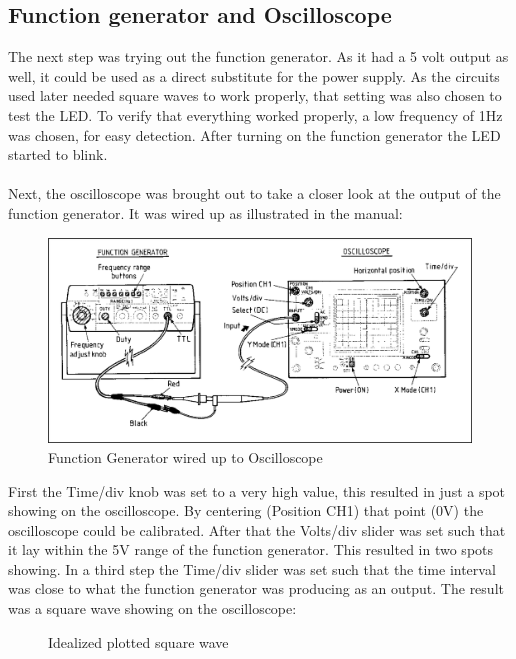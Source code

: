 \documentclass[fleqn,14pt]{article}
\begin{document}
\subsection {Function generator and Oscilloscope}
The next step was trying out the function generator. As it had a 5 volt output as well, it could be used as
a direct substitute for the power supply. As the circuits used later needed square waves to work properly,
that setting was also chosen to test the LED. To verify that everything worked properly, a low frequency of 1Hz
was chosen, for easy detection. After turning on the function generator the LED started
to blink.\\
\\
Next, the oscilloscope was brought out to take a closer look at the output of the function generator. It
was wired up as illustrated in the manual:
\begin{figure}[h]
\includegraphics[width=16cm]{images/Oscilloscope.png}
\caption{Function Generator wired up to Oscilloscope \cite{ross}}
\label{fig:figure1}
\end{figure}

First the Time/div knob was set to a very high value, this resulted in just a spot showing on the
oscilloscope. By centering (Position CH1) that point (0V) the oscilloscope could be calibrated. After that the
Volts/div slider was set such that it lay within the 5V range of the function generator. This resulted
in two spots showing. In a third step the Time/div slider was set such that the time interval was close
to what the function generator was producing as an output. The result was a square wave showing on the
oscilloscope:

\begin{figure}[H]
  \centering
  \caption{Idealized plotted square wave}
  \label{fig:figure2}
\end{figure}
\end{document}

